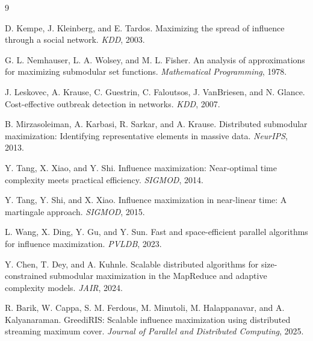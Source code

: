 \documentclass[9pt]{extarticle}
\begin{document}
\begin{thebibliography}{9}

D. Kempe, J. Kleinberg, and E. Tardos.
\newblock Maximizing the spread of influence through a social network.
\newblock \emph{KDD}, 2003.

G. L. Nemhauser, L. A. Wolsey, and M. L. Fisher.
\newblock An analysis of approximations for maximizing submodular set functions.
\newblock \emph{Mathematical Programming}, 1978.

J. Leskovec, A. Krause, C. Guestrin, C. Faloutsos, J. VanBriesen, and N. Glance.
\newblock Cost-effective outbreak detection in networks.
\newblock \emph{KDD}, 2007.

B. Mirzasoleiman, A. Karbasi, R. Sarkar, and A. Krause.
\newblock Distributed submodular maximization: Identifying representative elements in massive data.
\newblock \emph{NeurIPS}, 2013.

Y. Tang, X. Xiao, and Y. Shi.
\newblock Influence maximization: Near-optimal time complexity meets practical efficiency.
\newblock \emph{SIGMOD}, 2014.

Y. Tang, Y. Shi, and X. Xiao.
\newblock Influence maximization in near-linear time: A martingale approach.
\newblock \emph{SIGMOD}, 2015.

L. Wang, X. Ding, Y. Gu, and Y. Sun.
\newblock Fast and space-efficient parallel algorithms for influence maximization.
\newblock \emph{PVLDB}, 2023.

Y. Chen, T. Dey, and A. Kuhnle.
\newblock Scalable distributed algorithms for size-constrained submodular maximization in the MapReduce and adaptive complexity models.
\newblock \emph{JAIR}, 2024.

R. Barik, W. Cappa, S. M. Ferdous, M. Minutoli, M. Halappanavar, and A. Kalyanaraman.
\newblock GreediRIS: Scalable influence maximization using distributed streaming maximum cover.
\newblock \emph{Journal of Parallel and Distributed Computing}, 2025.

\end{thebibliography}
\end{document}
